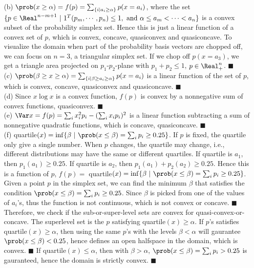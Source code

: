 \begin{itemize}
   (b) $\prob(x \ge \alpha) = f(p) =  \sum_{\{i|a_i\ge \alpha\}} p(x=a_i)$, where the set $\{p \in
\Real^{n-m+1} \ | \ 1^T(p_m,\cdots,p_n) \le 1, \text{ and } \alpha \le a_m < \cdots < a_n  \}$ is a
convex subset of the probability simplex set.  Hence this is just a linear function of a convex set
of $p$, which is convex, concave, quasiconvex and quasiconcave.  To visualize the domain when part
of the probability basis vectors are chopped off, we can focus on $n=3$, a triangular simplex set.
If we chop off $p(x=a_3)$, we get a triangle area projected on $p_1$-$p_2$-plane with $p_1+p_2 \le
1$, $p \in \Real_{+}^n$.  $\blacksquare$ \\

   (c) $\prob(\beta \ge x \ge \alpha) = \sum_{\{i| \beta \ge a_i \ge \alpha\}} p(x=a_i)$ is a linear
function of the set of $p$, which is convex, concave, quasiconvex and quasiconcave. $\blacksquare$
\\ 

   (d) Since $x\log x$ is a convex function, $f(p)$ is convex by a nonnegative sum of convex
functions, quasiconvex. $\blacksquare$ \\ 

   (e) $\Var x = f(p) = \sum_i x_i^2p_i - (\sum_i x_i p_i)^2$ is a linear function subtracting a sum
of nonnegative quadratic functions, which is concave, quasiconcave. $\blacksquare$ \\

   (f) quartile$(x) = \inf\{ \beta \ | \ \prob(x \le \beta) = \sum_i p_i \ge 0.25 \}$.  If $p$ is
fixed, the quartile only give a single number.  When $p$ changes, the quartile may change, i.e.,
different distributions may have the same or different quartiles.  If quartile is $a_1$, then
$p_1(a_1) \ge 0.25$.  If quartile is $a_2$, then $p_1(a_1)+p_2(a_2) \ge 0.25$.  Hence this is a
function of $p$, $f(p) =$ quartile$(x) = \inf\{ \beta \ | \ \prob(x \le \beta) = \sum_i p_i \ge 0.25
\}$.  Given a point $p$ in the simplex set, we can find the minimum $\beta$ that satisfies the
condition $\prob(x \le \beta) = \sum_i p_i \ge 0.25$.  Since $\beta$ is picked from one of the
values of $a_i$'s, thus the function is not continuous, which is not convex or concave.
$\blacksquare$ Therefore, we check if the sub-or-super-level sets are convex for
quasi-convex-or-concave.  The superlevel set is the $p$ satisfying quartile$(x) \ge \alpha$.  If
$p$'s satisfies quartile$(x) \ge \alpha$, then using the same $p$'s with the levels $\beta < \alpha$
will gaurantee $\prob(x \le \beta) < 0.25$, hence defines an open halfspace in the domain, which is
convex.  $\blacksquare$ If quartile$(x) \le \alpha$, then with $\beta > \alpha$, $\prob(x \le \beta)
= \sum_i p_i > 0.25$ is gauranteed, hence the domain is strictly convex. $\blacksquare$ \\




\end{itemize}
